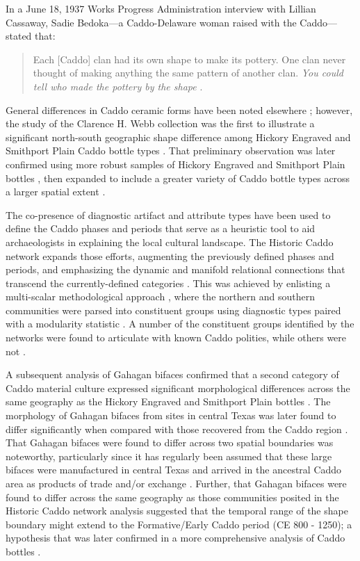 \documentclass[smallextended]{svjour3}       %
\begin{document}
In a June 18, 1937 Works Progress Administration interview with Lillian
Cassaway, Sadie Bedoka---a Caddo-Delaware woman raised with the
Caddo---stated that:

\begin{quote}
Each {[}Caddo{]} clan had its own shape to make its pottery. One clan
never thought of making anything the same pattern of another clan.
\emph{You could tell who made the pottery by the shape}
\cite[395]{RN9357x}.
\end{quote}

General differences in Caddo ceramic forms have been noted elsewhere
\cite{RN5650,RN7129,RN7162}; however, the study of the Clarence H. Webb
collection was the first to illustrate a significant north-south
geographic shape difference among Hickory Engraved and Smithport Plain
Caddo bottle types \cite{RN8370}. That preliminary observation was later
confirmed using more robust samples of Hickory Engraved and Smithport
Plain bottles \cite{RN8074,RN7927}, then expanded to include a greater
variety of Caddo bottle types across a larger spatial extent
\cite{RN8312}.

The co-presence of diagnostic artifact and attribute types have been
used to define the Caddo phases and periods that serve as a heuristic
tool to aid archaeologists in explaining the local cultural landscape.
The Historic Caddo network expands those efforts, augmenting the
previously defined phases and periods, and emphasizing the dynamic and
manifold relational connections that transcend the currently-defined
categories \cite{RN8031}. This was achieved by enlisting a multi-scalar
methodological approach \cite{RN5644,RN8039}, where the northern and
southern communities were parsed into constituent groups using
diagnostic types paired with a modularity statistic
\cite{RN8051,RN8024}. A number of the constituent groups identified by
the networks were found to articulate with known Caddo polities, while
others were not \cite{RN8031}.

A subsequent analysis of Gahagan bifaces confirmed that a second
category of Caddo material culture expressed significant morphological
differences across the same geography as the Hickory Engraved and
Smithport Plain bottles \cite{RN8158}. The morphology of Gahagan bifaces
from sites in central Texas was later found to differ significantly when
compared with those recovered from the Caddo region \cite{RN8322}. That
Gahagan bifaces were found to differ across two spatial boundaries was
noteworthy, particularly since it has regularly been assumed that these
large bifaces were manufactured in central Texas and arrived in the
ancestral Caddo area as products of trade and/or exchange
\cite{RN8322,RN8158}. Further, that Gahagan bifaces were found to differ
across the same geography as those communities posited in the Historic
Caddo network analysis suggested that the temporal range of the shape
boundary might extend to the Formative/Early Caddo period (CE 800 -
1250); a hypothesis that was later confirmed in a more comprehensive
analysis of Caddo bottles \cite{RN8312}.
\end{document}
